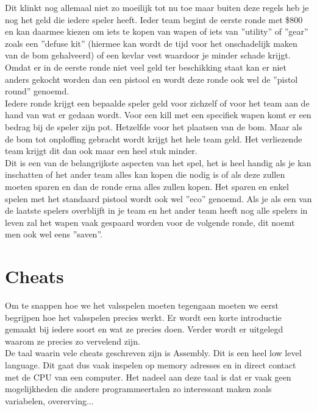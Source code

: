 \documentclass[pdftex,a4paper,12pt,twoside]{report}
\begin{document}
Dit klinkt nog allemaal niet zo moeilijk tot nu toe maar buiten deze regels heb je nog het geld die iedere speler heeft. Ieder team begint de eerste ronde met \$800 en kan daarmee kiezen om iets te kopen van wapen of iets van ''utility'' of ''gear'' zoals een ''defuse kit'' (hiermee kan wordt de tijd voor het onschadelijk maken van de bom gehalveerd) of een kevlar vest waardoor je minder schade krijgt. 
Omdat er in de eerste ronde niet veel geld ter beschikking staat kan er niet anders gekocht worden dan een pistool en wordt deze ronde ook wel de ''pistol round'' genoemd.
\\

Iedere ronde krijgt een bepaalde speler geld voor zichzelf of voor het team aan de hand van wat er gedaan wordt. Voor een kill met een specifiek wapen komt er een bedrag bij de speler zijn pot. Hetzelfde voor het plaatsen van de bom. Maar als de bom tot onploffing gebracht wordt krijgt het hele team geld. Het verliezende team krijgt dit dan ook maar een heel stuk minder.
\\

Dit is een van de belangrijkste aspecten van het spel, het is heel handig als je kan inschatten of het ander team alles kan kopen die nodig is of als deze zullen moeten sparen en dan de ronde erna alles zullen kopen. Het sparen en enkel spelen met het standaard pistool wordt ook wel ''eco'' genoemd. Als je als een van de laatste spelers overblijft in je team en het ander team heeft nog alle spelers in leven zal het wapen vaak gespaard worden voor de volgende ronde, dit noemt men ook wel eens ''saven''.


\chapter{Cheats}
\label{ch:cheats}

Om te snappen hoe we het valsspelen moeten tegengaan moeten we eerst begrijpen hoe het valsspelen precies werkt. Er wordt een korte introductie gemaakt bij iedere soort en wat ze precies doen. Verder wordt er uitgelegd waarom ze precies zo vervelend zijn.
\\

De taal waarin vele cheats geschreven zijn is Assembly. Dit is een heel low level language. Dit gaat dus vaak inspelen op memory adresses en in direct contact met de CPU van een computer. Het nadeel aan deze taal is dat er vaak geen mogelijkheden die andere programmeertalen zo interessant maken zoals variabelen, overerving...
\citep{assembly}
\end{document}
